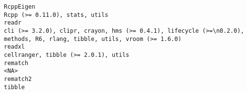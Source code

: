 \documentclass[
  letterpaper,
  DIV=11,
  numbers=noendperiod]{scrreprt}
\begin{document}
\begin{verbatim}
RcppEigen                                                                                                                                                                                                                                                                                                                                                                                                                                                                                                                                                                                   Rcpp (>= 0.11.0), stats, utils
readr                                                                                                                                                                                                                                                                                                                                                                                                                                                                                            cli (>= 3.2.0), clipr, crayon, hms (>= 0.4.1), lifecycle (>=\n0.2.0), methods, R6, rlang, tibble, utils, vroom (>= 1.6.0)
readxl                                                                                                                                                                                                                                                                                                                                                                                                                                                                                                                                                                                cellranger, tibble (>= 2.0.1), utils
rematch                                                                                                                                                                                                                                                                                                                                                                                                                                                                                                                                                                                                               <NA>
rematch2                                                                                                                                                                                                                                                                                                                                                                                                                                                                                                                                                                                                            tibble

\end{verbatim}
\end{document}
